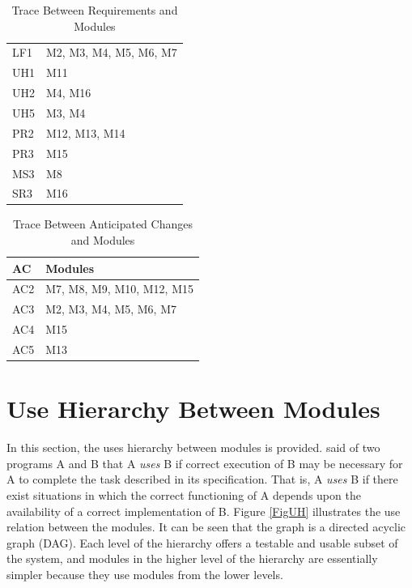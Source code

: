 \documentclass[12pt, titlepage]{article}
\begin{document}
\begin{table}[H]
	\centering
	\begin{tabular}{p{} p{}}
		\toprule
		LF1 & M2, M3, M4, M5, M6, M7\\
		UH1 & M11\\
		UH2 & M4, M16\\
		UH5 & M3, M4\\
		PR2 & M12, M13, M14 \\
		PR3 & M15\\
		MS3 & M8\\
		SR3 & M16\\
		\bottomrule
	\end{tabular}
\caption{Trace Between Requirements and Modules}
\label{TblRT}
\end{table}
\begin{table}[H]
\centering
\begin{tabular}{p{} p{}}
\toprule
\textbf{AC} & \textbf{Modules}\\
\midrule
AC2 &  M7, M8, M9, M10, M12, M15\\
AC3 & M2, M3, M4, M5, M6, M7\\
AC4 & M15\\
AC5 & M13\\
\bottomrule
\end{tabular}
\caption{Trace Between Anticipated Changes and Modules}
\label{TblACT}
\end{table}

\section{Use Hierarchy Between Modules} \label{SecUse}

In this section, the uses hierarchy between modules is
provided. \citet{Parnas1978} said of two programs A and B that A {\em uses} B if
correct execution of B may be necessary for A to complete the task described in
its specification. That is, A {\em uses} B if there exist situations in which
the correct functioning of A depends upon the availability of a correct
implementation of B.  Figure \ref{FigUH} illustrates the use relation between
the modules. It can be seen that the graph is a directed acyclic graph
(DAG). Each level of the hierarchy offers a testable and usable subset of the
system, and modules in the higher level of the hierarchy are essentially simpler
because they use modules from the lower levels.
\end{document}
